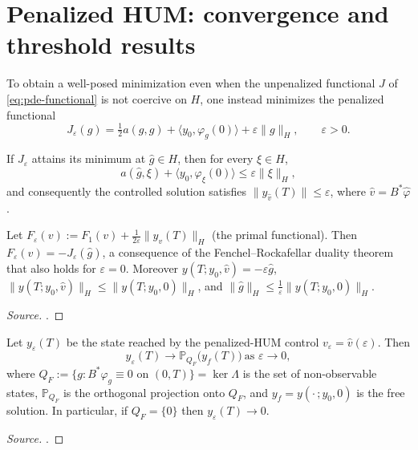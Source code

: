 \section{Penalized HUM: convergence and threshold results}
\label{sec:penalized}

To obtain a well-posed minimization even when the unpenalized functional $J$
of \eqref{eq:pde-functional} is not coercive on $H$, one instead minimizes the
penalized functional
\begin{equation}
  \label{eq:penalized-functional}
  J_\varepsilon(g) = \tfrac12 a(g,g) + \langle y_0,\varphi_g(0)\rangle
    + \varepsilon\|g\|_H, \qquad \varepsilon>0.
\end{equation}

\begin{proposition}
  \label{prop:critical-point}
  If $J_\varepsilon$ attains its minimum at $\hat g \in H$, then for every
  $\xi \in H$,
  \[
    a(\hat g,\xi) + \langle y_0,\varphi_\xi(0)\rangle \le \varepsilon\|\xi\|_H,
  \]
  and consequently the controlled solution satisfies
  $\|y_{\hat v}(T)\| \le \varepsilon$, where $\hat v = B^*\hat\varphi$.
\end{proposition}

\begin{proposition}
  \label{prop:penalized-duality}
  Let $F_\varepsilon(v) := F_1(v) + \tfrac{1}{2\varepsilon}\|y_v(T)\|_H$
  (the primal functional). Then
  $F_\varepsilon(\hat v) = -J_\varepsilon(\hat g)$, a consequence of the
  Fenchel--Rockafellar duality theorem \citep{ekeland1999convex} that also
  holds for $\varepsilon=0$. Moreover $y(T;y_0,\hat v) = -\varepsilon\hat g$,
  $\|y(T;y_0,\hat v)\|_H \le \|y(T;y_0,0)\|_H$, and
  $\|\hat g\|_H \le \tfrac1\varepsilon\|y(T;y_0,0)\|_H$.
\end{proposition}
\begin{proof}[Source]
  \citet[Prop.~1.5]{boyer2013penalised}.
\end{proof}

\begin{theorem}
  \label{thm:penalized-convergence}
  Let $y_\varepsilon(T)$ be the state reached by the penalized-HUM control
  $v_\varepsilon = \hat v(\varepsilon)$. Then
  \[
    y_\varepsilon(T) \to \mathbb{P}_{Q_F}\big(y_f(T)\big) \ \text{as } \varepsilon\to0,
  \]
  where $Q_F := \{g : B^*\varphi_g \equiv 0 \text{ on } (0,T)\} = \ker\Lambda$
  is the set of non-observable states, $\mathbb{P}_{Q_F}$ is the orthogonal
  projection onto $Q_F$, and $y_f = y(\cdot\,;y_0,0)$ is the free solution. In
  particular, if $Q_F = \{0\}$ then $y_\varepsilon(T) \to 0$.
\end{theorem}
\begin{proof}[Source]
  \citet[Thm.~1.11]{boyer2013penalised}.
\end{proof}

